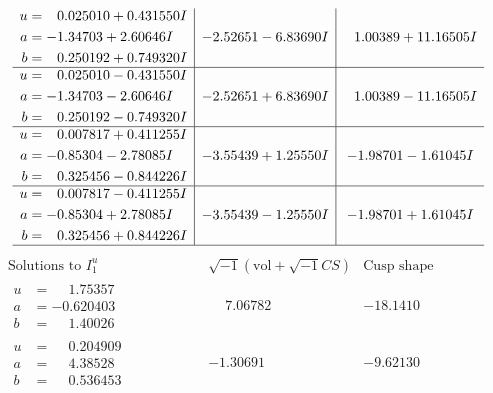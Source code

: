 \documentclass[1p]{elsarticle_modified}
\theoremstyle{definition}
\newcommand{\I}{\sqrt{-1}}
\begin{document}
$$\begin{array}{c|c|c}
\begin{aligned}
u &= \phantom{-}0.025010 + 0.431550 I \\
a &= -1.34703 + 2.60646 I \\
b &= \phantom{-}0.250192 + 0.749320 I\end{aligned}
 & -2.52651 - 6.83690 I & \phantom{-}1.00389 + 11.16505 I \\ \hline\begin{aligned}
u &= \phantom{-}0.025010 - 0.431550 I \\
a &= -1.34703 - 2.60646 I \\
b &= \phantom{-}0.250192 - 0.749320 I\end{aligned}
 & -2.52651 + 6.83690 I & \phantom{-}1.00389 - 11.16505 I \\ \hline\begin{aligned}
u &= \phantom{-}0.007817 + 0.411255 I \\
a &= -0.85304 - 2.78085 I \\
b &= \phantom{-}0.325456 - 0.844226 I\end{aligned}
 & -3.55439 + 1.25550 I & -1.98701 - 1.61045 I \\ \hline\begin{aligned}
u &= \phantom{-}0.007817 - 0.411255 I \\
a &= -0.85304 + 2.78085 I \\
b &= \phantom{-}0.325456 + 0.844226 I\end{aligned}
 & -3.55439 - 1.25550 I & -1.98701 + 1.61045 I\\
 \hline 
 \end{array}$$\newpage$$\begin{array}{c|c|c}  
\text{Solutions to }I^u_{1}& \I (\text{vol} + \sqrt{-1}CS) & \text{Cusp shape}\\
 \hline 
\begin{aligned}
u &= \phantom{-}1.75357\phantom{ +0.000000I} \\
a &= -0.620403\phantom{ +0.000000I} \\
b &= \phantom{-}1.40026\phantom{ +0.000000I}\end{aligned}
 & \phantom{-}7.06782\phantom{ +0.000000I} & -18.1410\phantom{ +0.000000I} \\ \hline\begin{aligned}
u &= \phantom{-}0.204909\phantom{ +0.000000I} \\
a &= \phantom{-}4.38528\phantom{ +0.000000I} \\
b &= \phantom{-}0.536453\phantom{ +0.000000I}\end{aligned}
 & -1.30691\phantom{ +0.000000I} & -9.62130\phantom{ +0.000000I} \\ \hline\begin{aligned}

\end{aligned}
\end{array}$$
\end{document}
